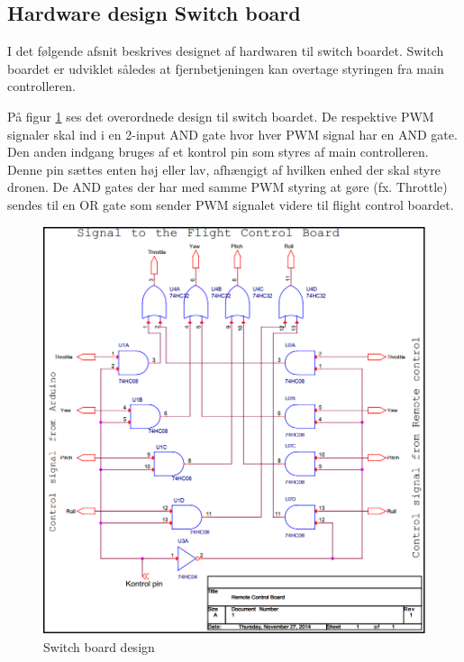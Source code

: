 \subsection{Hardware design Switch board}
I det følgende afsnit beskrives designet af hardwaren til switch boardet. Switch boardet er udviklet således at fjernbetjeningen kan overtage styringen fra main controlleren.

På figur \ref{fig:switchboard_design} ses det overordnede design til switch boardet. 
De respektive PWM signaler skal ind i en 2-input AND gate hvor hver PWM signal har en AND gate. Den anden indgang bruges af et kontrol pin som styres af main controlleren. Denne pin sættes enten høj eller lav, afhængigt af hvilken enhed der skal styre dronen. 
De AND gates der har med samme PWM styring at gøre (fx. Throttle) sendes til en OR gate som sender PWM signalet videre til flight control boardet. 

\begin{figure}[H]
	\centering
	\includegraphics[width=1\textwidth]{Billeder/hardware/switch_board_diagram.png}
	\caption{Switch board design}
	\label{fig:switchboard_design}
\end{figure}
